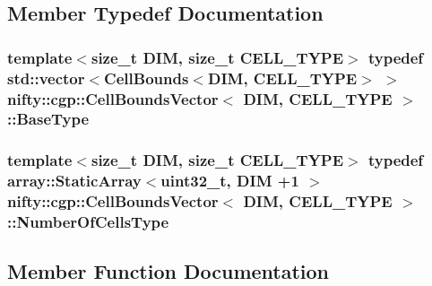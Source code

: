 \subsection{Member Typedef Documentation}
\hypertarget{classnifty_1_1cgp_1_1CellBoundsVector_ae9467b3782214101f6ca95a0219bbbb6}{}
\subsubsection[{Base\+Type}]{\setlength{\rightskip}{0pt plus 5cm}template$<$size\+\_\+t D\+I\+M, size\+\_\+t C\+E\+L\+L\+\_\+\+T\+Y\+P\+E$>$ typedef std\+::vector$<${\bf Cell\+Bounds}$<$D\+I\+M, C\+E\+L\+L\+\_\+\+T\+Y\+P\+E$>$ $>$ {\bf nifty\+::cgp\+::\+Cell\+Bounds\+Vector}$<$ D\+I\+M, C\+E\+L\+L\+\_\+\+T\+Y\+P\+E $>$\+::{\bf Base\+Type}}\label{classnifty_1_1cgp_1_1CellBoundsVector_ae9467b3782214101f6ca95a0219bbbb6}
\hypertarget{classnifty_1_1cgp_1_1CellBoundsVector_a4db6e267b7ec9e9bfd2db914354c49f9}{}
\subsubsection[{Number\+Of\+Cells\+Type}]{\setlength{\rightskip}{0pt plus 5cm}template$<$size\+\_\+t D\+I\+M, size\+\_\+t C\+E\+L\+L\+\_\+\+T\+Y\+P\+E$>$ typedef {\bf array\+::\+Static\+Array}$<$uint32\+\_\+t, D\+I\+M +1 $>$ {\bf nifty\+::cgp\+::\+Cell\+Bounds\+Vector}$<$ D\+I\+M, C\+E\+L\+L\+\_\+\+T\+Y\+P\+E $>$\+::{\bf Number\+Of\+Cells\+Type}}\label{classnifty_1_1cgp_1_1CellBoundsVector_a4db6e267b7ec9e9bfd2db914354c49f9}


\subsection{Member Function Documentation}
\hypertarget{classnifty_1_1cgp_1_1CellBoundsVector_a8ee7d5fa77d9e2c0239f37834e459937}{}
